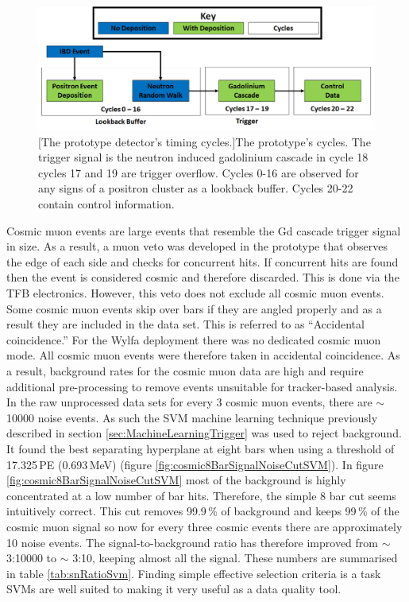 \begin{figure}[!h]
 \centering
 \includegraphics[width=\linewidth]{Chapter6/Figs/CycleExplaination.png}
 [The prototype detector's timing cycles.]{The prototype's cycles. The trigger signal is the neutron induced gadolinium cascade in cycle 18 cycles 17 and 19 are trigger overflow. Cycles 0-16 are observed for any signs of a positron cluster as a lookback buffer. Cycles 20-22 contain control information.} 
 \label{fig:CycleExplaination}
\end{figure}

Cosmic muon events are large events that resemble the Gd cascade trigger signal in size. As a result, a muon veto was developed in the prototype that observes the edge of each side and checks for concurrent hits. If concurrent hits are found then the event is considered cosmic and therefore discarded. This is done via the TFB electronics. However, this veto does not exclude all cosmic muon events. Some cosmic muon events skip over bars if they are angled properly and as a result they are included in the data set. This is referred to as ``Accidental coincidence.'' For the Wylfa deployment there was no dedicated cosmic muon mode. All cosmic muon events were therefore taken in accidental coincidence. As a result, background rates for the cosmic muon data are high and require additional pre-processing to remove events unsuitable for tracker-based analysis. In the raw unprocessed data sets for every 3 cosmic muon events, there are $\sim$ 10000 noise events. As such the SVM machine learning technique previously described in section \ref{sec:MachineLearningTrigger} was used to reject background. It found the best separating hyperplane at eight bars when using a threshold of 17.325\,PE (0.693\,MeV) (figure \ref{fig:cosmic8BarSignalNoiseCutSVM}). In figure \ref{fig:cosmic8BarSignalNoiseCutSVM} most of the background is highly concentrated at a low number of bar hits. Therefore, the simple 8 bar cut seems intuitively correct. This cut removes 99.9\,\% of background and keeps 99\,\% of the cosmic muon signal so now for every three cosmic events there are approximately 10 noise events. The signal-to-background ratio has therefore improved from $\sim$ 3:10000 to $\sim$ 3:10, keeping almost all the signal. These numbers are summarised in table \ref{tab:snRatioSvm}. Finding simple effective selection criteria is a task SVMs are well suited to making it very useful as a data quality tool. 


